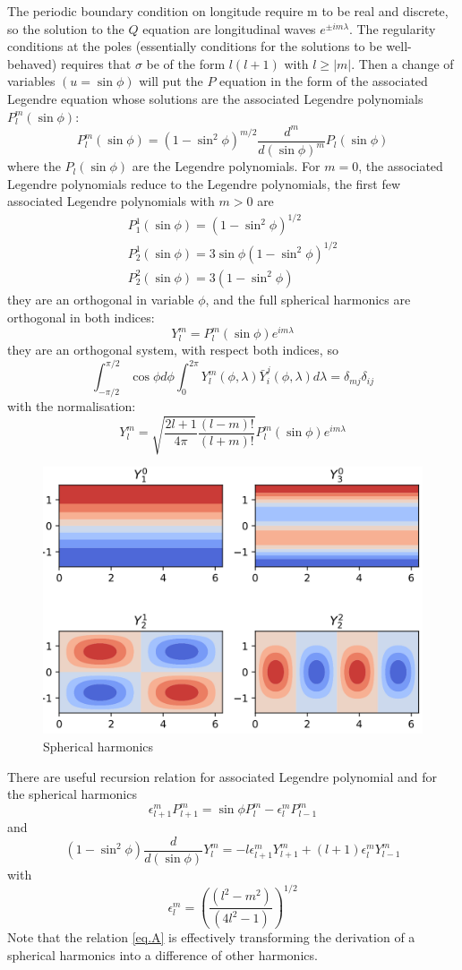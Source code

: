 The periodic boundary condition on longitude require m to be real and discrete, so the solution to the $Q$ equation are longitudinal waves $e^{\pm im\lambda}$. The regularity conditions at the poles (essentially conditions for the solutions to be well-behaved) requires that $\sigma$ be of the form $l(l+1)$ with $l\geq|m|$. Then a change of variables $(u=\sin\phi)$ will put the $P$ equation in the form of the associated Legendre equation whose solutions are the associated Legendre polynomials $P_l^m(\sin\phi)$:
\begin{equation}\label{eq.Legendre polyn}
    P_l^m(\sin\phi)=(1-\sin^2\phi)^{m/2}\frac{d^m}{d(\sin\phi)^m}P_l(\sin\phi)
\end{equation}
where the $P_l(\sin\phi)$ are the Legendre polynomials. For $m=0$, the associated Legendre polynomials reduce to the
Legendre polynomials, the first few associated Legendre
polynomials with $m>0$ are
\begin{align*}
    P_1^1(\sin\phi)=(1-\sin^2\phi)^{1/2}\\
    P_2^1(\sin\phi)=3\sin\phi(1-\sin^2\phi)^{1/2}\\
    P_2^2(\sin\phi)=3(1-\sin^2\phi)
\end{align*}
they are an orthogonal in variable $\phi$, and the full spherical harmonics are orthogonal in both indices: 
\begin{equation}
    Y_l^m=P_l^m(\sin\phi)e^{im\lambda}
\end{equation}
they are an orthogonal system, with respect both indices, so 
\begin{equation}
    \int_{-\pi/2}^{\pi/2}\cos\phi d\phi\int_0^{2\pi}Y_l^m(\phi,\lambda)\bar{Y}_i^j(\phi,\lambda)d\lambda=\delta_{mj}\delta_{ij}
\end{equation}
with the normalisation: 
$$Y_l^m=\sqrt{\frac{2l+1}{4\pi}\frac{(l-m)!}{(l+m)!}}P_l^m(\sin\phi)e^{im\lambda}$$
\begin{figure}[h]
    \centering
    \includegraphics[width=0.5\linewidth]{uploads/Screenshot 2024-11-17 201945.png}
    \caption{Spherical harmonics}
    \label{fig:spherical harmonics}
\end{figure}
There are useful recursion relation for associated Legendre
polynomial and for the spherical harmonics
$$\epsilon_{l+1}^mP_{l+1}^m=\sin\phi P^m_l-\epsilon_l^mP^m_{l-1}$$
and 
\begin{equation}\label{eq.A}
    (1-\sin^2\phi)\frac{d}{d(\sin\phi)}Y_l^m=-l\epsilon_{l+1}^mY_{l+1}^m+(l+1)\epsilon_l^mY_{l-1}^m
\end{equation}
with 
$$\epsilon_l^m=\left(\frac{(l^2-m^2)}{(4l^2-1)}\right)^{1/2}$$
Note that the relation \ref{eq.A} is effectively transforming the derivation of a spherical harmonics into a difference of other harmonics.



